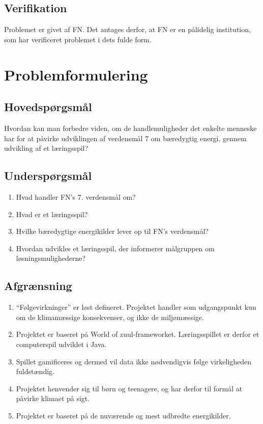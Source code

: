 \documentclass[a4paper,12pt]{report}
\begin{document}
\subsection{Verifikation}
Problemet er givet af FN. Det antages derfor, at FN er en pålidelig institution, som har verificeret problemet i dets fulde form.

\section{Problemformulering}
\subsection{Hovedspørgsmål}
Hvordan kan man forbedre viden, om de handlemuligheder det enkelte menneske har for at påvirke udviklingen af verdensmål 7 om bæredygtig energi, gennem udvikling af et læringsspil?

\subsection{Underspørgsmål}
\begin{enumerate}
	\item Hvad handler FN’s 7. verdensmål om?
	\item Hvad er et læringsspil?
	\item Hvilke bæredygtige energikilder lever op til FN’s verdensmål?
	\item Hvordan udvikles et læringsspil, der informerer målgruppen om løsningsmulighederne?
\end{enumerate}

\subsection{Afgrænsning}
\begin{enumerate}
	\item “Følgevirkninger” er løst defineret. Projektet handler som udgangspunkt kun om de klimamæssige konsekvenser, og ikke de miljømæssige.
	\item Projektet er baseret på World of zuul-frameworket. Læringsspillet er derfor et computerspil udviklet i Java.
	\item Spillet gamificeres og dermed vil data ikke nødvendigvis følge virkeligheden fuldstændig.
	\item Projektet henvender sig til børn og teenagere, og har derfor til formål at påvirke klimaet på sigt.
	\item Projektet er baseret på de nuværende og mest udbredte energikilder.
\end{enumerate}
\end{document}
